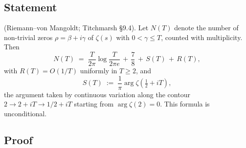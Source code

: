 \subsection{Statement}
\label{v4-arith:w5-i:rvm-statement}

\begin{theorem}
\label{v4-arith:w5-i:thm:rvm}
\ClaimStatusProvedElsewhere (Riemann--von Mangoldt; Titchmarsh \S9.4).
Let \(N(T)\) denote the number of non-trivial
zeros \(\rho=\beta+i\gamma\) of \(\zeta(s)\) with \(0<\gamma\leq T\),
counted with multiplicity. Then
\begin{equation}
\label{v4-arith:w5-i:eq:rvm}
N(T)\;=\;\frac{T}{2\pi}\log\!\frac{T}{2\pi e}\,+\,\frac{7}{8}\,+\,S(T)\,+\,R(T),
\end{equation}
with \(R(T)=O(1/T)\) uniformly in \(T\geq 2\), and
\begin{equation}
\label{v4-arith:w5-i:eq:ST-def}
S(T)\;:=\;\frac{1}{\pi}\arg\zeta\!\left(\tfrac{1}{2}+iT\right),
\end{equation}
the argument taken by continuous variation along the contour
\(2\to 2+iT\to 1/2+iT\) starting from \(\arg\zeta(2)=0\). This formula is
unconditional.
\end{theorem}

\subsection{Proof}
\label{v4-arith:w5-i:rvm-proof}

